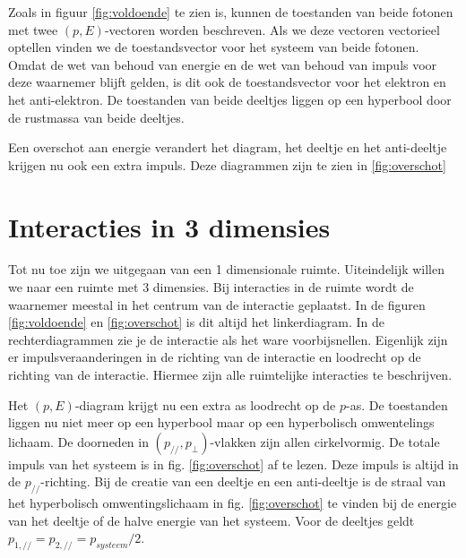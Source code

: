 Zoals in figuur \ref{fig:voldoende} te zien is, kunnen de toestanden van beide fotonen met twee $\left(p, 
E\right)$-vectoren worden beschreven. Als we deze vectoren vectorieel optellen
vinden we de toestandsvector voor het systeem van beide fotonen. Omdat
de wet van behoud van energie en de wet van behoud van impuls voor
deze waarnemer blijft gelden, is dit ook de toestandsvector voor het
elektron en het anti-elektron. De toestanden van beide deeltjes liggen
op een hyperbool door de rustmassa van beide deeltjes. 


Een overschot aan energie verandert het diagram, het deeltje en het anti-deeltje krijgen nu ook een extra impuls. Deze diagrammen zijn te zien in \ref{fig:overschot}

\newpage{}

\section{Interacties in 3 dimensies}

Tot nu toe zijn we uitgegaan van een 1 dimensionale ruimte. Uiteindelijk willen we naar een ruimte met 3 dimensies. Bij interacties in de ruimte wordt de waarnemer meestal in het centrum van de interactie geplaatst. In de figuren \ref{fig:voldoende} en \ref{fig:overschot} is dit altijd het linkerdiagram. In de rechterdiagrammen zie je de interactie als het ware voorbijsnellen. Eigenlijk zijn er impulsveraanderingen in de richting van de interactie en loodrecht op de richting van de interactie. Hiermee zijn alle ruimtelijke interacties te beschrijven.

Het $(p,E)$-diagram krijgt nu een extra as loodrecht op de $p$-as. De toestanden liggen nu niet meer op een hyperbool maar op een hyperbolisch omwentelings lichaam. De doorneden in $\left(p_{//},p_{\perp}\right)$-vlakken zijn allen cirkelvormig. De totale impuls van het systeem is in fig. \ref{fig:overschot} af te lezen. Deze impuls is altijd in de $p_{//}$-richting. Bij de creatie van een deeltje en een anti-deeltje is de straal van het hyperbolisch omwentingslichaam in fig. \ref{fig:overschot} te vinden bij de energie van het deeltje of de halve energie van het systeem. Voor de deeltjes geldt $p_{1,//}=p_{2,//}=p_{systeem}/2$.

